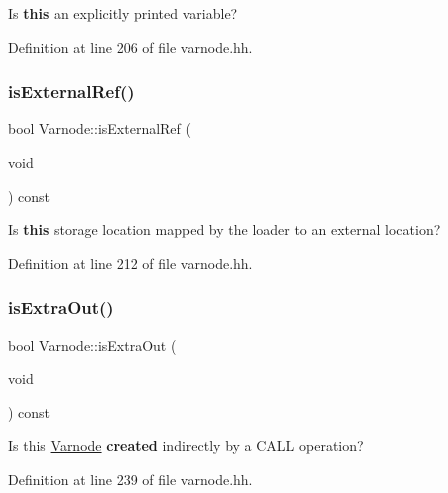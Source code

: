 Is {\bfseries{this}} an explicitly printed variable? 



Definition at line 206 of file varnode.\+hh.

\mbox{\label{class_varnode_a93e31966bc3f8102e49438e18c8bb8da}} 
\subsubsection{\texorpdfstring{isExternalRef()}{isExternalRef()}}
{\footnotesize\ttfamily bool Varnode\+::is\+External\+Ref (\begin{DoxyParamCaption}\item[{void}]{ }\end{DoxyParamCaption}) const\hspace{0.3cm}{\ttfamily [inline]}}



Is {\bfseries{this}} storage location mapped by the loader to an external location? 



Definition at line 212 of file varnode.\+hh.

\mbox{\label{class_varnode_a1759575be3f53457006b912a008fc532}} 
\subsubsection{\texorpdfstring{isExtraOut()}{isExtraOut()}}
{\footnotesize\ttfamily bool Varnode\+::is\+Extra\+Out (\begin{DoxyParamCaption}\item[{void}]{ }\end{DoxyParamCaption}) const\hspace{0.3cm}{\ttfamily [inline]}}



Is this \mbox{\hyperlink{class_varnode}{Varnode}} {\bfseries{created}} indirectly by a C\+A\+LL operation? 



Definition at line 239 of file varnode.\+hh.

\mbox{\label{class_varnode_a4e94e389fbd82df4b13352d9b8a5f1f4}} 
